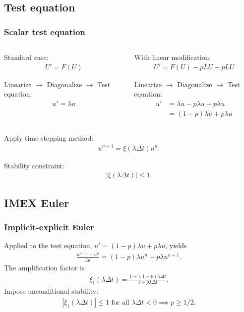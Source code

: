 \documentclass[hyperref={pdfpagelabels=false}]{beamer}
\begin{document}
\subsection{Test equation}
\begin{frame}
	\frametitle{Scalar test equation}
	\begin{columns}
\begin{column}{0.46\textwidth}
	Standard case:
	\begin{align*} 
		U' = F(U)
	\end{align*} 

Linearize $\to$ Diagonalize $\to$ Test equation: 
	\begin{align*} 
		u' = \lambda u
	\end{align*} 
\end{column}
\begin{column}{0.46\textwidth}
	With linear modification: 
	\begin{align*} 
		U' = F(U) - pLU + pLU
	\end{align*}

Linearize $\to$ Diagonalize $\to$ Test equation: 
	\begin{align*}
		u' &= \lambda u - p\lambda u + p\lambda u 
\\
		&= (1-p)\lambda u + p\lambda u 
	\end{align*}
\end{column}
	\end{columns}
Apply time stepping method: 
	\begin{align*} 
		u^{n+1} = \xi(\lambda\Delta t) u^n.
	\end{align*} 

Stability constraint: 
	\begin{align*}
		\left\vert \xi(\lambda\Delta t)\right\vert \leq 1.
	\end{align*}
\end{frame}

\subsection{IMEX Euler}
\begin{frame}
	\frametitle{Implicit-explicit Euler} 
Applied to the test equation, $u' = (1-p)\lambda u + p\lambda u$, yields 
	\begin{align*}
		\frac{u^{n+1} - u^n}{\Delta t} = (1-p)\lambda u^n + p\lambda u^{n+1}.
	\end{align*}
The amplification factor is 
	\begin{align*}
		\xi_1(\lambda\Delta t) 
		= \frac{1 + (1-p)\lambda\Delta t}{1 - p\lambda\Delta t}. 
	\end{align*}
Impose unconditional stability: 
	\begin{align*}
		\left\vert \xi_1(\lambda\Delta t)\right \vert \leq 1  
		\text{ for all }\lambda \Delta t < 0 \implies p \geq 1/2.
	\end{align*}
\end{frame}
\end{document}
